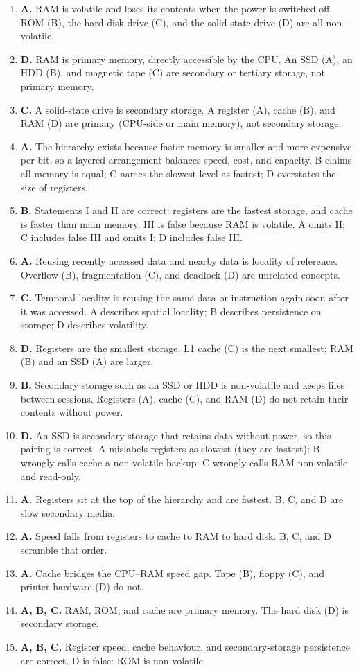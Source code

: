 \documentclass[11pt]{article}
\begin{document}
\begin{enumerate}[label=\textbf{Q\arabic*.}, leftmargin=*]
\item \textbf{A.} RAM is volatile and loses its contents when the power is
  switched off. ROM (B), the hard disk drive (C), and the solid-state drive
  (D) are all non-volatile.
\item \textbf{D.} RAM is primary memory, directly accessible by the CPU. An
  SSD (A), an HDD (B), and magnetic tape (C) are secondary or tertiary
  storage, not primary memory.
\item \textbf{C.} A solid-state drive is secondary storage. A register (A),
  cache (B), and RAM (D) are primary (CPU-side or main memory), not
  secondary storage.
\item \textbf{A.} The hierarchy exists because faster memory is smaller and
  more expensive per bit, so a layered arrangement balances speed, cost, and
  capacity. B claims all memory is equal; C names the slowest level as
  fastest; D overstates the size of registers.
\item \textbf{B.} Statements I and II are correct: registers are the fastest
  storage, and cache is faster than main memory. III is false because RAM is
  volatile. A omits II; C includes false III and omits I; D includes false
  III.
\item \textbf{A.} Reusing recently accessed data and nearby data is locality
  of reference. Overflow (B), fragmentation (C), and deadlock (D) are
  unrelated concepts.
\item \textbf{C.} Temporal locality is reusing the same data or instruction
  again soon after it was accessed. A describes spatial locality; B describes
  persistence on storage; D describes volatility.
\item \textbf{D.} Registers are the smallest storage. L1 cache (C) is the
  next smallest; RAM (B) and an SSD (A) are larger.
\item \textbf{B.} Secondary storage such as an SSD or HDD is non-volatile
  and keeps files between sessions. Registers (A), cache (C), and RAM (D) do
  not retain their contents without power.
\item \textbf{D.} An SSD is secondary storage that retains data without
  power, so this pairing is correct. A mislabels registers as slowest (they
  are fastest); B wrongly calls cache a non-volatile backup; C wrongly calls
  RAM non-volatile and read-only.

\item \textbf{A.} Registers sit at the top of the hierarchy and are fastest. B, C, and D are slow secondary media.
\item \textbf{A.} Speed falls from registers to cache to RAM to hard disk. B, C, and D scramble that order.
\item \textbf{A.} Cache bridges the CPU--RAM speed gap. Tape (B), floppy (C), and printer hardware (D) do not.
\item \textbf{A, B, C.} RAM, ROM, and cache are primary memory. The hard disk (D) is secondary storage.
\item \textbf{A, B, C.} Register speed, cache behaviour, and secondary-storage persistence are correct. D is false: ROM is non-volatile.
\end{enumerate}
\def\JKSSBLessonID{7}\def\JKSSBAnswers{1}
\end{document}
